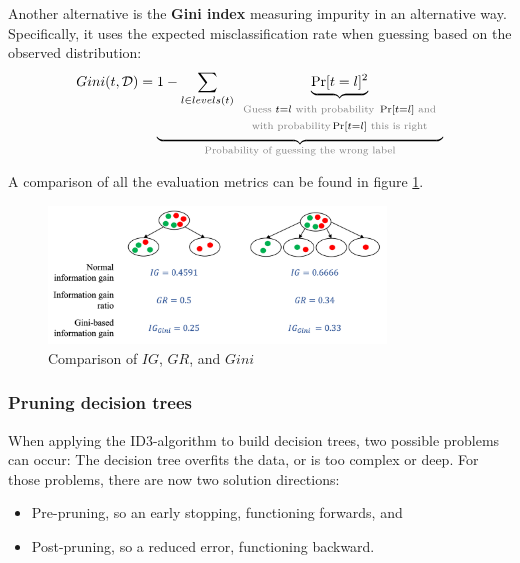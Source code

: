 Another alternative is the \textbf{Gini index} measuring impurity in an alternative way. Specifically, it uses the expected misclassification rate when guessing based on the observed distribution:
\renewcommand{\arraystretch}{0.6}
\begin{align*}
  Gini(t,\mathcal{D}) = \underbrace{1-\sum_{l\in levels(t)}\underbrace{\Pr[t=l]^2}_{\begin{array}{c}
    \scriptstyle\text{\color{gray}Guess } t=l \text{ \color{gray} with probability } \Pr[t=l] \text{ \color{gray} and}\\
    \scriptstyle\text{\color{gray}with probability}  \Pr[t=l] \text{ \color{gray} this is right}
  \end{array}}}_{\text{\color{gray}Probability of guessing the wrong label}}
\end{align*}
\renewcommand{\arraystretch}{1} 

A comparison of all the evaluation metrics can be found in figure \ref{fig:3_id3_alternative_evaluation}.

\begin{figure}[h]
  \centering
  \includegraphics[width=0.8\textwidth]{assets/trees/id3/comp_evaluation_metrics.png}
  \caption{Comparison of $IG$, $GR$, and $Gini$}
  \label{fig:3_id3_alternative_evaluation}
\end{figure}


\subsubsection*{Pruning decision trees}
When applying the ID3-algorithm to build decision trees, two possible problems can occur: The decision tree overfits the data, or is too complex or deep.
For those problems, there are now two solution directions:
\begin{itemize}
  \item Pre-pruning, so an early stopping, functioning forwards, and
  \item Post-pruning, so a reduced error, functioning backward.
\end{itemize}


